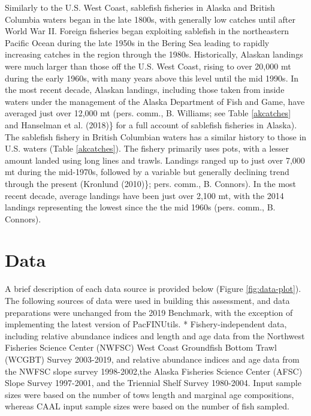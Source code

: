 \documentclass[11pt,
  english,
  a4paper,
]{article}
\begin{document}

Similarly to the U.S. West Coast, sablefish fisheries in Alaska and British Columbia waters began in the late 1800s, with generally low catches until after World War II. Foreign fisheries began exploiting sablefish in the northeastern Pacific Ocean during the late 1950s in the Bering Sea leading to rapidly increasing catches in the region through the 1980s. Historically, Alaskan landings were much larger than those off the U.S. West Coast, rising to over 20,000 mt during the early 1960s, with many years above this level until the mid 1990s. In the most recent decade, Alaskan landings, including those taken from inside waters under the management of the Alaska Department of Fish and Game, have averaged just over 12,000 mt (pers. comm., B. Williams; see Table \ref{akcatches} and {Hanselman et al. (2018)\leavevmode\tagmcend\tagstructend}\} for a full account of sablefish fisheries in Alaska). The sablefish fishery in British Columbian waters has a similar history to those in U.S. waters (Table \ref{akcatches}). The fishery primarily uses pots, with a lesser amount landed using long lines and trawls. Landings ranged up to just over 7,000 mt during the mid-1970s, followed by a variable but generally declining trend through the present ({Kronlund (2010)\leavevmode\tagmcend\tagstructend}\}; pers. comm., B. Connors). In the most recent decade, average landings have been just over 2,100 mt, with the 2014 landings representing the lowest since the the mid 1960s (pers. comm., B. Connors).

\leavevmode\tagmcend\tagstructend\par


\hypertarget{data}{%
\section{Data}\label{data}}

\leavevmode\tagmcend\tagstructend


A brief description of each data source is provided below (Figure \ref{fig:data-plot}). The following sources of data were used in building this assessment, and data preparations were unchanged from the 2019 Benchmark, with the exception of implementing the latest version of PacFINUtils. * Fishery-independent data, including relative abundance indices and length and age data from the Northwest Fisheries Science Center (NWFSC) West Coast Groundfish Bottom Trawl (WCGBT) Survey 2003-2019, and relative abundance indices and age data from the NWFSC slope survey 1998-2002,the Alaska Fisheries Science Center (AFSC) Slope Survey 1997-2001, and the Triennial Shelf Survey 1980-2004. Input sample sizes were based on the number of tows length and marginal age compositions, whereas CAAL input sample sizes were based on the number of fish sampled.
\end{document}
